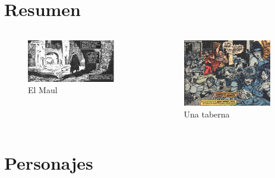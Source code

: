 \section{Resumen}
\note[itemize]{
	\item
}

\begin{frame}{}
	\begin{columns}
		\begin{figure}[htb]
			\centering
			\includegraphics[width=0.9\textwidth]{img/res/01}
			\caption{El Maul}
		\end{figure}
		\begin{figure}[htb]
			\centering
			\includegraphics[width=0.9\textwidth]{img/res/02}
			\caption{Una taberna}
		\end{figure}
	\end{columns}
\end{frame}
\note{

}


\section{Personajes}
\note[itemize]{
	\item
}

